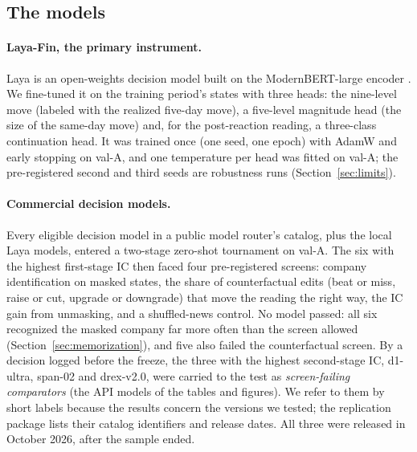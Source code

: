 \subsection{The models}\label{sec:models}

\paragraph{Laya-Fin, the primary instrument.} Laya is an open-weights decision model built on the
ModernBERT-large encoder \citep{convaiinnovations2026,warner2025}. We fine-tuned it on the training period's states
with three heads: the nine-level move (labeled with the realized five-day move), a five-level magnitude head (the
size of the same-day move) and, for the post-reaction reading, a three-class continuation head. It was trained
once (one seed, one epoch) with AdamW \citep{loshchilov2019} and early stopping on val-A, and one temperature per
head was fitted on val-A; the pre-registered second and third seeds are robustness runs
(Section~\ref{sec:limits}).

\paragraph{Commercial decision models.} Every eligible decision model in a public model router's catalog, plus
the local Laya models, entered a two-stage zero-shot tournament on val-A. The six with the highest first-stage IC
then faced four pre-registered screens: company identification on masked states, the share of counterfactual
edits (beat or miss, raise or cut, upgrade or downgrade) that move the reading the right way, the IC gain from
unmasking, and a shuffled-news control. No model passed: all six recognized the masked company far more often than
the screen allowed (Section~\ref{sec:memorization}), and five also failed the counterfactual screen. By a decision
logged before the freeze, the three with the highest second-stage IC, d1-ultra, span-02 and drex-v2.0, were
carried to the test as \emph{screen-failing comparators} (the API models of the tables and figures). We refer to
them by short labels because the results
concern the versions we tested; the replication package lists their catalog identifiers and release dates. All
three were released in October 2026, after the sample ended.

